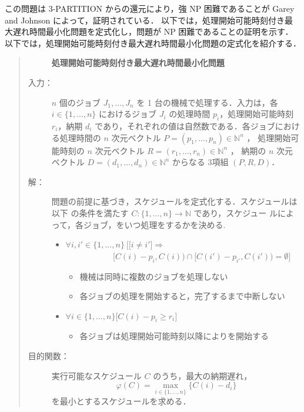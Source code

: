 \documentclass[12pt]{optlab-bachelor}
\begin{document}
この問題は \textsc{3-PARTITION} からの還元により，強 NP 困難であることが Garey and Johnson \cite{3SAT}によって，証明されている．
以下では，処理開始可能時刻付き最大遅れ時間最小化問題を定式化し，問題が NP 困難であることの証明を示す．
以下では，処理開始可能時刻付き最大遅れ時間最小化問題の定式化を紹介する．
\begin{quote}
  \begin{description}
    \item[] {\bf 処理開始可能時刻付き最大遅れ時間最小化問題}
    \item[入力：] $n$ 個のジョブ $J_1,\ldots,J_n$ を 1 台の機械で処理する．入力は，各 $i \in \{1,\ldots,n\}$ におけるジョブ $J_i$ の処理時間 $p_i$，処理開始可能時刻
    $r_i$，納期 $d_i$ であり，それぞれの値は自然数である．各ジョブにおける処理時間の $n$ 次元ベクトル $P = (p_1,\ldots,p_n) \in \mathbb{N}^n$ ，
    処理開始可能時刻の $n$ 次元ベクトル $R = (r_1,\ldots,r_n) \in \mathbb{N}^n$ ，
    納期の $n$ 次元ベクトル $D = (d_1,\ldots,d_n) \in \mathbb{N}^n$ からなる 3項組 $(P,R,D)$．
    \item[解：] 問題の前提に基づき，スケジュールを定式化する．スケジュールは以下
    の条件を満たす $C : \{1,\ldots,n\} \to \mathbb{N}$ であり，スケジュー
    ルによって，各ジョブ，をいつ処理をするかを決める.
    \begin{itemize}
      \item $\forall i, i' \in \{1,\ldots,n\}\ \Big[ \big[i \neq i' \big] \Rightarrow$ \\ $~~~~~~~~~~~~~~~~~~~~~~~~~~[C(i) - p_i, C(i)) \cap [C(i') - p_{i'}, C(i')) = \emptyset \Big]$
      \begin{itemize}
        \item 機械は同時に複数のジョブを処理しない
        \item 各ジョブの処理を開始すると，完了するまで中断しない
      \end{itemize}
      \item  $\forall i \in \{1,\ldots,n\}\big[C(i) - p_i \ge r_i\big]$
      \begin{itemize}
        \item 各ジョブは処理開始可能時刻以降によりを開始する
      \end{itemize}
    \end{itemize}
    \item[目的関数：] 実行可能なスケジュール $C$ のうち，最大の納期遅れ，
    \begin{displaymath}
      \varphi(C) = \max_{i \in \{1,\ldots,n\}}\{C(i) - d_i\}
    \end{displaymath}
    を最小とするスケジュールを求める．
  \end{description}
\end{quote}
\end{document}
